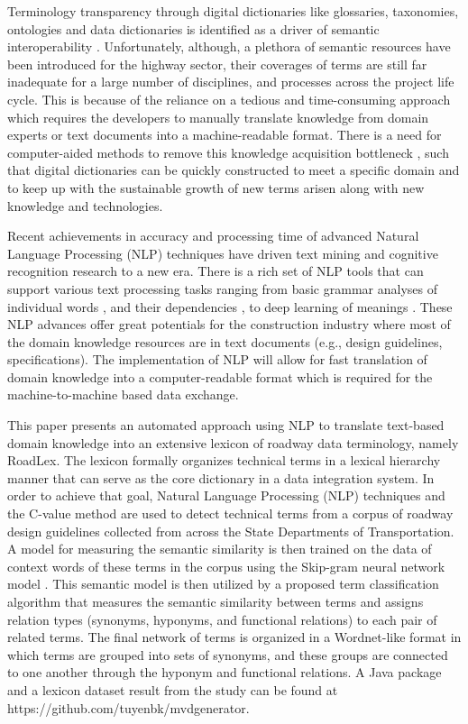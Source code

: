 \documentclass[Journal, BackFigs, DoubleSpace]{ascelike}%
\begin{document}
Terminology transparency through digital dictionaries like glossaries, taxonomies, ontologies and data dictionaries is identified as a driver of semantic interoperability \cite{ouksel99}. Unfortunately, although, a plethora of semantic resources have been introduced for the highway sector, their coverages of terms are still far inadequate for a large number of disciplines, and processes across the project life cycle. This is because of the reliance on a  tedious and time-consuming approach which requires the developers to manually translate knowledge from domain experts or text documents into a machine-readable format. There is a need for computer-aided methods to remove this knowledge acquisition bottleneck \cite{mounce10}, such that digital dictionaries can be quickly constructed to meet a specific domain and to keep up with the sustainable growth of new terms arisen along with new knowledge and technologies.
\par
Recent achievements in accuracy and processing time of advanced Natural Language Processing (NLP) techniques have driven text mining and cognitive recognition research to a new era. There is a rich set of NLP tools that can support various text processing tasks ranging from basic grammar analyses of individual words \cite{Toutanova03,Cunningham02}, and their dependencies \cite{chen14}, to deep learning of meanings \cite{mikolov13a,pennington2014glove}. These NLP advances offer great potentials for the construction industry where most of the domain knowledge resources are in text documents (e.g., design guidelines, specifications). The implementation of NLP will allow for fast translation of domain knowledge into a computer-readable format which is required for the machine-to-machine based data exchange.
\par
This paper presents an automated approach using NLP to translate text-based domain knowledge into an extensive lexicon of roadway data terminology, namely RoadLex. The lexicon formally organizes technical terms in a lexical hierarchy manner that can serve as the core dictionary in a data integration system. In order to achieve that goal, Natural Language Processing (NLP) techniques and the C-value method \cite{frantzi20} are used to detect technical terms from a corpus of roadway design guidelines collected from across the State Departments of Transportation. A model for measuring the semantic similarity is then trained on the data of context words of these terms in the corpus using the Skip-gram neural network model \cite{mikolov13a}. This semantic model is then utilized by a proposed term classification algorithm that measures the semantic similarity between terms and assigns relation types (synonyms, hyponyms, and functional relations) to each pair of related terms. The final network of terms is organized in a Wordnet-like format in which terms are grouped into sets of synonyms, and these groups are connected to one another through the hyponym and functional relations. A Java package and a lexicon dataset result from the study can be found at https://github.com/tuyenbk/mvdgenerator.
\end{document}
